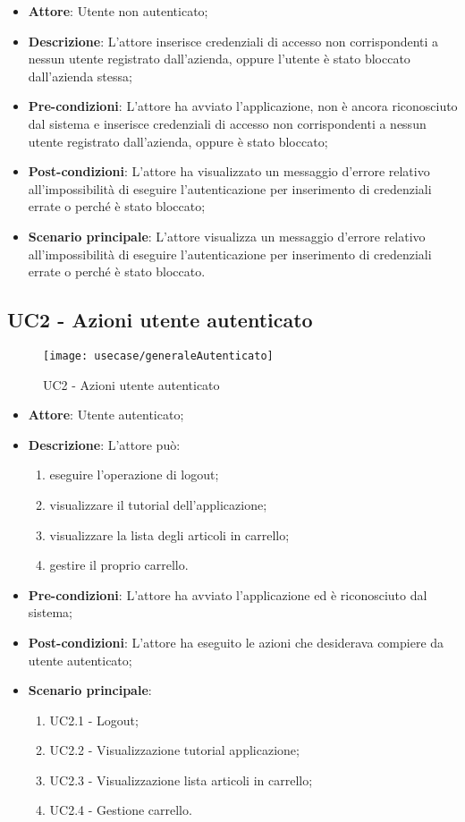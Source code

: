 \begin{itemize}
	\item \textbf{Attore}: Utente non autenticato;
	\item \textbf{Descrizione}: L'attore inserisce credenziali di accesso non corrispondenti a nessun utente registrato dall'azienda, oppure l'utente è stato bloccato dall'azienda stessa;
	\item \textbf{Pre-condizioni}: L'attore ha avviato l'applicazione, non è ancora riconosciuto dal sistema e inserisce credenziali di accesso non corrispondenti a nessun utente registrato dall'azienda, oppure è stato bloccato;
	\item \textbf{Post-condizioni}: L'attore ha visualizzato un messaggio d'errore relativo all'impossibilità di eseguire l'autenticazione per inserimento di credenziali errate o perché è stato bloccato;
	\item \textbf{Scenario principale}: L'attore visualizza un messaggio d'errore relativo all'impossibilità di eseguire l'autenticazione per inserimento di credenziali errate o perché è stato bloccato.
\end{itemize}

\subsection{UC2 - Azioni utente autenticato}

\begin{figure}[!h] 
    \centering 
    \texttt{[image: usecase/generaleAutenticato]} 
    \caption{UC2 - Azioni utente autenticato}
\end{figure}

\begin{itemize}
	\item \textbf{Attore}: Utente autenticato;
	\item \textbf{Descrizione}: L'attore può:
	\begin{enumerate}
		\item eseguire l'operazione di logout;
		\item visualizzare il tutorial dell'applicazione;
		\item visualizzare la lista degli articoli in carrello;
		\item gestire il proprio carrello. 
	\end{enumerate}
	\item \textbf{Pre-condizioni}: L'attore ha avviato l'applicazione ed è riconosciuto dal sistema;
	\item \textbf{Post-condizioni}: L'attore ha eseguito le azioni che desiderava compiere da utente autenticato;
	\item \textbf{Scenario principale}: 
		\begin{enumerate}
			\item UC2.1 - Logout;
			\item UC2.2 - Visualizzazione tutorial applicazione;
			\item UC2.3 - Visualizzazione lista articoli in carrello;
			\item UC2.4 - Gestione carrello.
		\end{enumerate}
\end{itemize}

